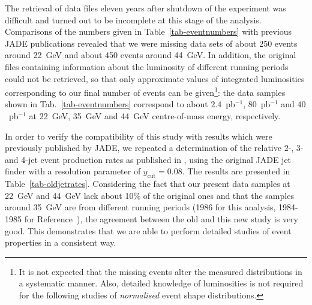 \documentclass[12pt,a4paper,twoside]{article}
\newcommand{\ycut}   {\ensuremath{y_{\mathrm{cut}}}}
\begin{document}
The retrieval of data files eleven years after shutdown of 
the experiment was difficult and turned out to be
incomplete at this stage of the analysis. 
Comparisons of the numbers given in Table~\ref{tab-eventnumbers} with
previous JADE publications \cite{bib-JADEeventsel,bib-jadjet1,bib-JADEtune} 
revealed that we were missing data sets of about 250
events around 22~GeV and about 450 events around 44~GeV.
In addition, the original files containing 
information about the luminosity of different
running periods could not be retrieved, so that 
only approximate values of integrated
luminosities corresponding to our final number of events 
can be given\footnote{It is not 
expected that the missing events alter the measured distributions
in a systematic manner. 
Also, detailed knowledge of luminosities is not required for 
the following studies
of {\em normalised} event shape distributions.}: 
the data samples shown in
Tab.~\ref{tab-eventnumbers} correspond to about $2.4$~pb$^{-1}$, 
$80$~pb$^{-1}$ and
$40$~pb$^{-1}$ at 22~GeV, 35~GeV and 44~GeV centre-of-mass energy, 
respectively.

In order to verify the compatibility of this study with results which were
previously published by JADE, we repeated a determination of the relative
2-, 3- and 4-jet event production rates as published in
\cite{bib-JADEeventsel}, using the original JADE jet finder with a
resolution parameter of $\ycut = 0.08$.
The results are presented in Table~\ref{tab-oldjetrates}.
Considering the fact that our present data samples at 22~GeV and 44~GeV 
lack about 10\% of the original ones and that the samples around 35~GeV
are from different running periods (1986 for this analysis, 1984-1985 for 
Reference~\protect\cite{bib-JADEeventsel}), the agreement between the old
and this new study is very good.  This demonstrates that we are able to
perform detailed studies of event properties in a consistent way.
\end{document}
